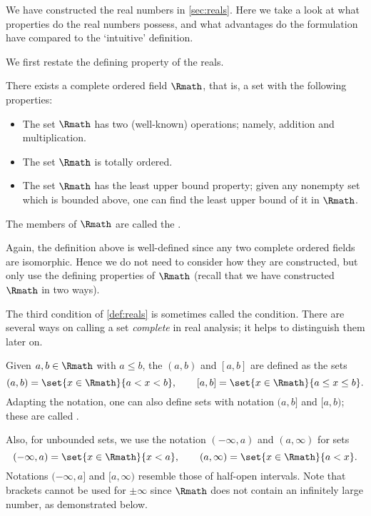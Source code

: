  \label{sec:reals}

We have constructed the real numbers in \cref{sec:reals}.
Here we take a look at what properties do the real numbers possess,
and what advantages do the formulation have
compared to the `intuitive' definition.

We first restate the defining property of the reals.

\begin{definition}
    \label{def:reals}
    There exists a complete ordered field \(\Rmath\),
    that is, a set with the following properties:
    \begin{itemize}
        \item The set \(\Rmath\) has two (well-known) operations;
        namely, addition and multiplication.
        \item The set \(\Rmath\) is totally ordered.
        \item The set \(\Rmath\) has the least upper bound property;
        given any nonempty set which is bounded above,
        one can find the least upper bound of it in \(\Rmath\).
    \end{itemize}
    The members of \(\Rmath\) are called the .
\end{definition}

Again, the definition above is well-defined
since any two complete ordered fields are isomorphic.
Hence we do not need to consider how they are constructed,
but only use the defining properties of \(\Rmath\)
(recall that we have constructed \(\Rmath\) in two ways).

The third condition of \cref{def:reals}
is sometimes called the  condition.
There are several ways on
calling a set \emph{complete} in real analysis;
it helps to distinguish them later on.

\begin{definition}[Intervals]
    \label{def:interval}
    Given \(a,b\in\Rmath\) with \(a\le b\),
    the  \((a,b)\)
    and  \([a,b]\)
    are defined as the sets
    \[
        (a,b)=\set{x\in\Rmath}{a<x<b},
        \qquad
        [a,b]=\set{x\in\Rmath}{a\le x\le b}.
    \]
    Adapting the notation,
    one can also define sets with notation \((a,b]\) and \([a,b)\);
    these are called .
    
    Also, for unbounded sets, we use the notation
    \((-\infty,a)\) and \((a,\infty)\) for sets
    \[
        (-\infty,a)=\set{x\in\Rmath}{x<a},
        \qquad
        (a,\infty)=\set{x\in\Rmath}{a<x}.
    \]
    Notations \((-\infty,a]\) and \([a,\infty)\)
    resemble those of half-open intervals.
    Note that brackets cannot be used for \(\pm\infty\)
    since \(\Rmath\) does not contain an infinitely large number,
    as demonstrated below.
\end{definition}

